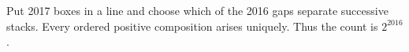 Put 2017 boxes in a line and choose which of the 2016 gaps separate successive stacks. Every ordered positive composition arises uniquely. Thus the count is $\boxed{2^{2016}}$.
